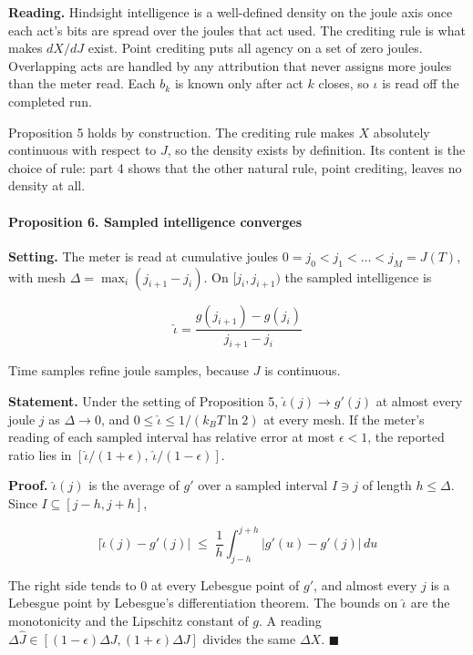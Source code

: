 \documentclass[
  10pt,
]{article}
\begin{document}
\textbf{Reading.} Hindsight intelligence is a well-defined density on
the joule axis once each act's bits are spread over the joules that act
used. The crediting rule is what makes \(dX/dJ\) exist. Point crediting
puts all agency on a set of zero joules. Overlapping acts are handled by
any attribution that never assigns more joules than the meter read. Each
\(b_k\) is known only after act \(k\) closes, so \(\iota\) is read off
the completed run.

Proposition 5 holds by construction. The crediting rule makes \(X\)
absolutely continuous with respect to \(J\), so the density exists by
definition. Its content is the choice of rule: part 4 shows that the
other natural rule, point crediting, leaves no density at all.

\paragraph{Proposition 6. Sampled intelligence
converges}\label{proposition-6.-sampled-intelligence-converges}

\textbf{Setting.} The meter is read at cumulative joules
\(0 = j_0 < j_1 < \dots < j_M = J(T)\), with mesh
\(\Delta = \max_i (j_{i+1} - j_i)\). On \([j_i, j_{i+1})\) the sampled
intelligence is

\[\hat\iota = \frac{g(j_{i+1}) - g(j_i)}{j_{i+1} - j_i}\]

Time samples refine joule samples, because \(J\) is continuous.

\textbf{Statement.} Under the setting of Proposition 5,
\(\hat\iota(j) \to g'(j)\) at almost every joule \(j\) as
\(\Delta \to 0\), and \(0 \le \hat\iota \le 1/(k_BT\ln 2)\) at every
mesh. If the meter's reading of each sampled interval has relative error
at most \(\epsilon < 1\), the reported ratio lies in
\([\hat\iota/(1+\epsilon),\, \hat\iota/(1-\epsilon)]\).

\textbf{Proof.} \(\hat\iota(j)\) is the average of \(g'\) over a sampled
interval \(I \ni j\) of length \(h \le \Delta\). Since
\(I \subseteq [j - h, j + h]\),

\[\big|\hat\iota(j) - g'(j)\big| \;\le\; \frac{1}{h}\int_{j-h}^{j+h}\big|g'(u) - g'(j)\big|\,du\]

The right side tends to 0 at every Lebesgue point of \(g'\), and almost
every \(j\) is a Lebesgue point by Lebesgue's differentiation theorem.
The bounds on \(\hat\iota\) are the monotonicity and the Lipschitz
constant of \(g\). A reading
\(\Delta\hat J \in [(1-\epsilon)\Delta J, (1+\epsilon)\Delta J]\)
divides the same \(\Delta X\). \(\blacksquare\)
\end{document}
